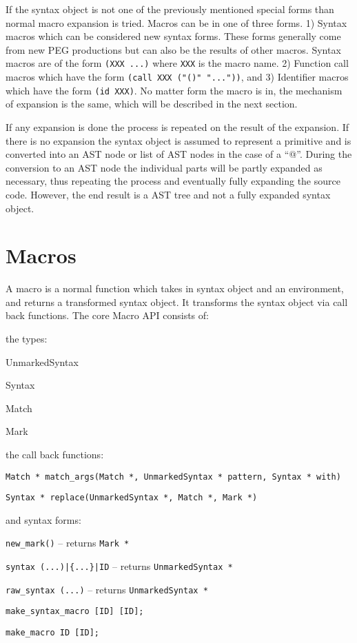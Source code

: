 \documentclass[12pt,english,letterpaper]{article}
\begin{document}
If the syntax object is not one of the previously mentioned special
forms than normal macro expansion is tried.  Macros can be in one of
three forms. 1) Syntax macros which can be considered new syntax
forms.  These forms generally come from new PEG productions but can
also be the results of other macros.  Syntax macros are of the form
\verb/(XXX ...)/ where \verb/XXX/ is the macro name.  2) Function call
macros which have the form \verb/(call XXX ("()" "..."))/, and 3)
Identifier macros which have the form \verb/(id XXX)/.  No matter form
the macro is in, the mechanism of expansion is the same, which will be
described in the next section.

If any expansion is done the process is repeated on the result of the
expansion.  If there is no expansion the syntax object is assumed to
represent a primitive and is converted into an AST node or list of AST
nodes in the case of a ``@''.  During the conversion to an AST node
the individual parts will be partly expanded as necessary, thus
repeating the process and eventually fully expanding the source code.
However, the end result is a AST tree and not a fully expanded syntax
object.

\section{Macros}

A macro is a normal function which takes in syntax object and an
environment, and returns a transformed syntax object.  It transforms the
syntax object via call back functions.  The core Macro API consists of:
\begin{itemize*}
\item the types:
\begin{itemize*}
\item UnmarkedSyntax
\item Syntax
\item Match
\item Mark
\end{itemize*}
\item the call back functions:
\begin{itemize*}
\item \verb/Match * match_args(Match *, UnmarkedSyntax * pattern, Syntax * with)/
\item \verb/Syntax * replace(UnmarkedSyntax *, Match *, Mark *)/
\end{itemize*}
\item and syntax forms:
\begin{itemize*}
\item \verb/new_mark()/ -- returns \verb/Mark */
\item \verb/syntax (...)|{...}|ID/ -- returns \verb/UnmarkedSyntax */
\item \verb/raw_syntax (...)/ -- returns \verb/UnmarkedSyntax */
\item \verb/make_syntax_macro [ID] [ID];/
\item \verb/make_macro ID [ID];/
\end{itemize*}
\end{itemize*}
\end{document}
